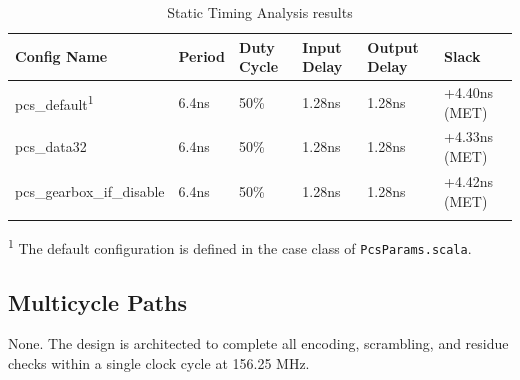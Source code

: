 \renewcommand*{\arraystretch}{1.4}
\begin{longtable}[H]{
    | p{}
    | p{}
    | p{}
    | p{}
    | p{}
    | p{} |
  }
  \hline
  \textbf{Config Name}  &
  \textbf{Period}       &
  \textbf{Duty Cycle}   &
  \textbf{Input Delay}  &
  \textbf{Output Delay} &
  \textbf{Slack}          \\ \hline \hline

  pcs\_default\textsuperscript{1}          &
  6.4ns                 &
  50\% & 
  1.28ns & 
  1.28ns & 
  +4.40ns (MET)         \\ \hline

  pcs\_data32          &
  6.4ns                 &
  50\% & 
  1.28ns & 
  1.28ns & 
  +4.33ns (MET)         \\ \hline

  pcs\_gearbox\_if\_disable          &
  6.4ns                 &
  50\% & 
  1.28ns & 
  1.28ns & 
  +4.42ns (MET)         \\ \hline

  \caption{Static Timing Analysis results}\label{table:timing}
\end{longtable}

\small{\textsuperscript{1} The default configuration is defined in the case class of \texttt{PcsParams.scala}.}

\subsection{Multicycle Paths}
None. The design is architected to complete all encoding, scrambling, and residue checks within a single clock cycle at 156.25 MHz.
